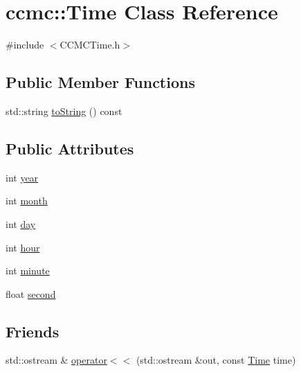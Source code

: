 \hypertarget{classccmc_1_1_time}{\section{ccmc\-:\-:Time Class Reference}
\label{classccmc_1_1_time}
}


{\ttfamily \#include $<$C\-C\-M\-C\-Time.\-h$>$}

\subsection*{Public Member Functions}
\begin{DoxyCompactItemize}
\item 
std\-::string \hyperlink{classccmc_1_1_time_a7e94b1cb0a765b26e1fa9998df29b1e5}{to\-String} () const 
\end{DoxyCompactItemize}
\subsection*{Public Attributes}
\begin{DoxyCompactItemize}
\item 
int \hyperlink{classccmc_1_1_time_a5f1d2d7bf202a400b3a101645f93c1a0}{year}
\item 
int \hyperlink{classccmc_1_1_time_a837bd8b4d92b602f60f99741270515d2}{month}
\item 
int \hyperlink{classccmc_1_1_time_aadc5355945380825c132e4c1cddcb24f}{day}
\item 
int \hyperlink{classccmc_1_1_time_aacdc28bb90a2c42e0b266a596220ef40}{hour}
\item 
int \hyperlink{classccmc_1_1_time_a163cc0bbdcf86f8a009a26d3c2764f17}{minute}
\item 
float \hyperlink{classccmc_1_1_time_a569557baed8e5bf1e30cea22aa4a76c9}{second}
\end{DoxyCompactItemize}
\subsection*{Friends}
\begin{DoxyCompactItemize}
\item 
std\-::ostream \& \hyperlink{classccmc_1_1_time_a9afb1e291f336f52015df4db3a44863e}{operator$<$$<$} (std\-::ostream \&out, const \hyperlink{classccmc_1_1_time}{Time} time)
\end{DoxyCompactItemize}


